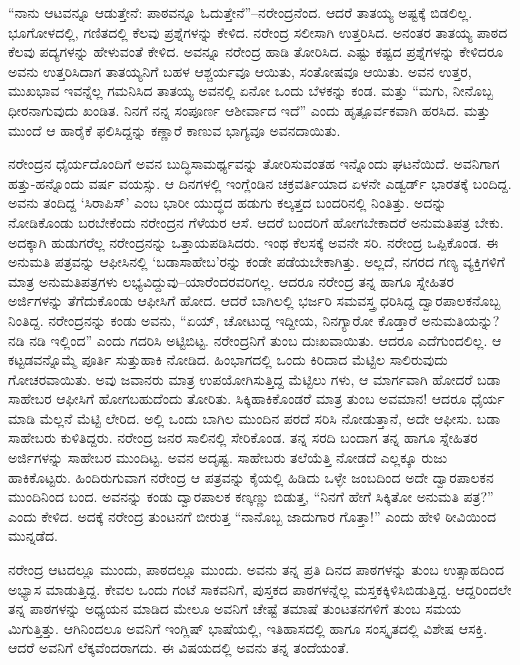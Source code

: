 “ನಾನು ಆಟವನ್ನೂ ಆಡುತ್ತೇನೆ: ಪಾಠವನ್ನೂ ಓದುತ್ತೇನೆ”–ನರೇಂದ್ರನೆಂದ. ಆದರೆ ತಾತಯ್ಯ ಅಷ್ಟಕ್ಕೆ ಬಿಡಲಿಲ್ಲ. ಭೂಗೋಳದಲ್ಲಿ, ಗಣಿತದಲ್ಲಿ ಕೆಲವು ಪ್ರಶ್ನೆಗಳನ್ನು ಕೇಳಿದ. ನರೇಂದ್ರ ಸಲೀಸಾಗಿ ಉತ್ತರಿಸಿದ. ಅನಂತರ ತಾತಯ್ಯ ಪಾಠದ ಕೆಲವು ಪದ್ಯಗಳನ್ನು ಹೇಳುವಂತೆ ಕೇಳಿದ. ಅವನ್ನೂ ನರೇಂದ್ರ ಹಾಡಿ ತೋರಿಸಿದ. ಎಷ್ಟು ಕಷ್ಟದ ಪ್ರಶ್ನೆಗಳನ್ನು ಕೇಳಿದರೂ ಅವನು ಉತ್ತರಿಸಿದಾಗ ತಾತಯ್ಯನಿಗೆ ಬಹಳ ಆಶ್ಚರ್ಯವೂ ಆಯಿತು, ಸಂತೋಷವೂ ಆಯಿತು. ಅವನ ಉತ್ತರ, ಮುಖಭಾವ ಇವನ್ನೆಲ್ಲ ಗಮನಿಸಿದ ತಾತಯ್ಯ ಅವನಲ್ಲಿ ಏನೋ ಒಂದು ಬೆಳಕನ್ನು ಕಂಡ. ಮತ್ತು “ಮಗು, ನೀನೊಬ್ಬ ಧೀರನಾಗುವುದು ಖಂಡಿತ. ನಿನಗೆ ನನ್ನ ಸಂಪೂರ್ಣ ಆಶೀರ್ವಾದ ಇದೆ” ಎಂದು ಹೃತ್ಪೂರ್ವಕವಾಗಿ ಹರಸಿದ. ಮತ್ತು ಮುಂದೆ ಆ ಹಾರೈಕೆ ಫಲಿಸಿದ್ದನ್ನು ಕಣ್ಣಾರೆ ಕಾಣುವ ಭಾಗ್ಯವೂ ಅವನದಾಯಿತು.

ನರೇಂದ್ರನ ಧೈರ್ಯದೊಂದಿಗೆ ಅವನ ಬುದ್ಧಿಸಾಮರ್ಥ್ಯವನ್ನು ತೋರಿಸುವಂತಹ ಇನ್ನೊಂದು ಘಟನೆಯಿದೆ. ಅವನಿಗಾಗ ಹತ್ತು-ಹನ್ನೊಂದು ವರ್ಷ ವಯಸ್ಸು. ಆ ದಿನಗಳಲ್ಲಿ ಇಂಗ್ಲೆಂಡಿನ ಚಕ್ರವರ್ತಿಯಾದ ಏಳನೇ ಎಡ್ವರ್ಡ್ ಭಾರತಕ್ಕೆ ಬಂದಿದ್ದ. ಅವನು ತಂದಿದ್ದ ‘ಸಿರಾಪಿಸ್’ ಎಂಬ ಭಾರೀ ಯುದ್ಧದ ಹಡುಗು ಕಲ್ಕತ್ತದ ಬಂದರಿನಲ್ಲಿ ನಿಂತಿತ್ತು. ಅದನ್ನು ನೋಡಿಕೊಂಡು ಬರಬೇಕೆಂದು ನರೇಂದ್ರನ ಗೆಳೆಯರ ಆಸೆ. ಆದರೆ ಬಂದರಿಗೆ ಹೋಗಬೇಕಾದರೆ ಅನುಮತಿಪತ್ರ ಬೇಕು. ಅದಕ್ಕಾಗಿ ಹುಡುಗರೆಲ್ಲ ನರೇಂದ್ರನನ್ನು ಒತ್ತಾಯಪಡಿಸಿದರು. ಇಂಥ ಕೆಲಸಕ್ಕೆ ಅವನೇ ಸರಿ. ನರೇಂದ್ರ ಒಪ್ಪಿಕೊಂಡ. ಈ ಅನುಮತಿ ಪತ್ರವನ್ನು ಆಫೀಸಿನಲ್ಲಿ ‘ಬಡಾಸಾಹೇಬ’ರನ್ನು ಕಂಡೇ ಪಡೆಯಬೇಕಾಗಿತ್ತು. ಅಲ್ಲದೆ, ನಗರದ ಗಣ್ಯ ವ್ಯಕ್ತಿಗಳಿಗೆ ಮಾತ್ರ ಅನುಮತಿಪತ್ರಗಳು ಲಭ್ಯವಿದ್ದುವು–ಯಾರೆಂದರವರಿಗಲ್ಲ. ಆದರೂ ನರೇಂದ್ರ ತನ್ನ ಹಾಗೂ ಸ್ನೇಹಿತರ ಅರ್ಜಿಗಳನ್ನು ತೆಗೆದುಕೊಂಡು ಆಫೀಸಿಗೆ ಹೋದ. ಆದರೆ ಬಾಗಿಲಲ್ಲಿ ಭರ್ಜರಿ ಸಮವಸ್ತ್ರ ಧರಿಸಿದ್ದ ದ್ವಾರಪಾಲಕನೊಬ್ಬ ನಿಂತಿದ್ದ. ನರೇಂದ್ರನನ್ನು ಕಂಡು ಅವನು, “ಏಯ್, ಚೋಟುದ್ದ ಇದ್ದೀಯ, ನಿನಗ್ಯಾರೋ ಕೊಡ್ತಾರೆ ಅನುಮತಿಯನ್ನು? ನಡಿ ನಡಿ ಇಲ್ಲಿಂದ” ಎಂದು ಗದರಿಸಿ ಅಟ್ಟಿಬಿಟ್ಟ. ನರೇಂದ್ರನಿಗೆ ತುಂಬ ದುಃಖವಾಯಿತು. ಆದರೂ ಎದೆಗುಂದಲಿಲ್ಲ. ಆ ಕಟ್ಟಡವನ್ನೊಮ್ಮೆ ಪೂರ್ತಿ ಸುತ್ತುಹಾಕಿ ನೋಡಿದ. ಹಿಂಭಾಗದಲ್ಲಿ ಒಂದು ಕಿರಿದಾದ ಮೆಟ್ಟಿಲ ಸಾಲಿರುವುದು ಗೋಚರವಾಯಿತು. ಅವು ಜವಾನರು ಮಾತ್ರ ಉಪಯೋಗಿಸುತ್ತಿದ್ದ ಮೆಟ್ಟಿಲು ಗಳು, ಆ ಮಾರ್ಗವಾಗಿ ಹೋದರೆ ಬಡಾ ಸಾಹೇಬರ ಆಫೀಸಿಗೆ ಹೋಗಬಹುದೆಂದು ತೋರಿತು. ಸಿಕ್ಕಿಹಾಕಿಕೊಂಡರೆ ಮಾತ್ರ ತುಂಬ ಅವಮಾನ! ಆದರೂ ಧೈರ್ಯ ಮಾಡಿ ಮೆಲ್ಲನೆ ಮೆಟ್ಟಿ ಲೇರಿದ. ಅಲ್ಲಿ ಒಂದು ಬಾಗಿಲ ಮುಂದಿನ ಪರದೆ ಸರಿಸಿ ನೋಡುತ್ತಾನೆ, ಅದೇ ಆಫೀಸು. ಬಡಾ ಸಾಹೇಬರು ಕುಳಿತಿದ್ದರು. ನರೇಂದ್ರ ಜನರ ಸಾಲಿನಲ್ಲಿ ಸೇರಿಕೊಂಡ. ತನ್ನ ಸರದಿ ಬಂದಾಗ ತನ್ನ ಹಾಗೂ ಸ್ನೇಹಿತರ ಅರ್ಜಿಗಳನ್ನು ಸಾಹೇಬರ ಮುಂದಿಟ್ಟ. ಅವನ ಅದೃಷ್ಟ. ಸಾಹೇಬರು ತಲೆಯೆತ್ತಿ ನೋಡದೆ ಎಲ್ಲಕ್ಕೂ ರುಜು ಹಾಕಿಕೊಟ್ಟರು. ಹಿಂದಿರುಗುವಾಗ ನರೇಂದ್ರ ಆ ಪತ್ರವನ್ನು ಕೈಯಲ್ಲಿ ಹಿಡಿದು ಒಳ್ಳೇ ಜಂಬದಿಂದ ಅದೇ ದ್ವಾರಪಾಲಕನ ಮುಂದಿನಿಂದ ಬಂದ. ಅವನನ್ನು ಕಂಡು ದ್ವಾರಪಾಲಕ ಕಣ್ಕಣ್ಣು ಬಿಡುತ್ತ, “ನಿನಗೆ ಹೇಗೆ ಸಿಕ್ಕಿತೋ ಅನುಮತಿ ಪತ್ರ?” ಎಂದು ಕೇಳಿದ. ಅದಕ್ಕೆ ನರೇಂದ್ರ ತುಂಟನಗೆ ಬೀರುತ್ತ “ನಾನೊಬ್ಬ ಜಾದುಗಾರ ಗೊತ್ತಾ!” ಎಂದು ಹೇಳಿ ಠೀವಿಯಿಂದ ಮುನ್ನಡೆದ.

ನರೇಂದ್ರ ಆಟದಲ್ಲೂ ಮುಂದು, ಪಾಠದಲ್ಲೂ ಮುಂದು. ಅವನು ತನ್ನ ಪ್ರತಿ ದಿನದ ಪಾಠಗಳನ್ನು ತುಂಬ ಉತ್ಸಾಹದಿಂದ ಅಭ್ಯಾಸ ಮಾಡುತ್ತಿದ್ದ. ಕೇವಲ ಒಂದು ಗಂಟೆ ಸಾಕವನಿಗೆ, ಪುಸ್ತಕದ ಪಾಠಗಳನ್ನೆಲ್ಲ ಮಸ್ತಕಕ್ಕಿಳಿಸಿಬಿಡುತ್ತಿದ್ದ. ಆದ್ದರಿಂದಲೇ ತನ್ನ ಪಾಠಗಳನ್ನು ಅಧ್ಯಯನ ಮಾಡಿದ ಮೇಲೂ ಅವನಿಗೆ ಚೇಷ್ಟೆ ತಮಾಷೆ ತುಂಟತನಗಳಿಗೆ ತುಂಬ ಸಮಯ ಮಿಗುತ್ತಿತ್ತು. ಆಗಿನಿಂದಲೂ ಅವನಿಗೆ ಇಂಗ್ಲಿಷ್ ಭಾಷೆಯಲ್ಲಿ, ಇತಿಹಾಸದಲ್ಲಿ ಹಾಗೂ ಸಂಸ್ಕೃತದಲ್ಲಿ ವಿಶೇಷ ಆಸಕ್ತಿ. ಆದರೆ ಅವನಿಗೆ ಲೆಕ್ಕವೆಂದರಾಗದು. ಈ ವಿಷಯದಲ್ಲಿ ಅವನು ತನ್ನ ತಂದೆಯಂತೆ.

